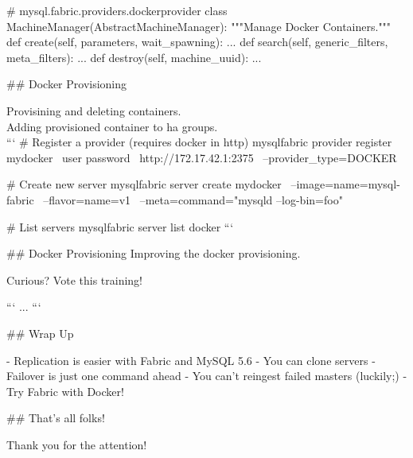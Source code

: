 \begin{pycode}
# mysql.fabric.providers.dockerprovider
class MachineManager(AbstractMachineManager):
    """Manage Docker Containers."""
    def create(self, parameters, wait_spawning):
        ...
    def search(self, generic_filters, meta_filters):
        ...
    def destroy(self, machine_uuid):
        ...
\end{pycode}



## Docker Provisioning

Provisining and deleting containers. \\

Adding provisioned container to ha groups. \\

```
# Register a provider (requires docker in http)
mysqlfabric provider register mydocker \
    user password \
    http://172.17.42.1:2375  \
    --provider_type=DOCKER

# Create new server
mysqlfabric server create mydocker \
    --image=name=mysql-fabric   \
    --flavor=name=v1            \
    --meta=command="mysqld --log-bin=foo"

# List servers
mysqlfabric server list docker
```



## Docker Provisioning
Improving the docker provisioning.

Curious? Vote this training!

```
...
```

## Wrap Up

  -  Replication is easier with Fabric and MySQL 5.6
  -  You can clone servers
  -  Failover is just one command ahead
  -  You can't re\-ingest failed masters (luckily;)
  -  Try Fabric with Docker!




## That's all folks!
\begin{center}
Thank you for the attention! \\\\
\insertauthor
\end{center}




